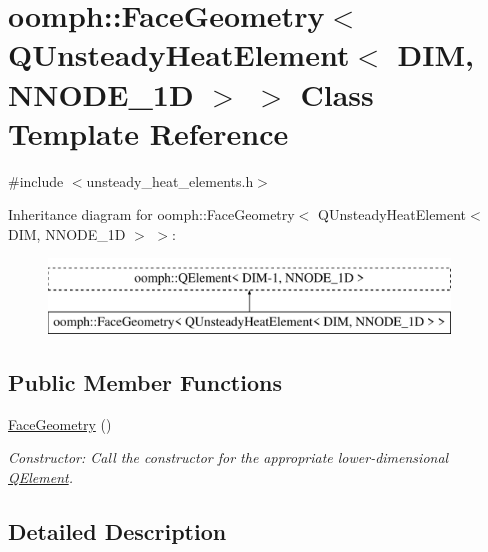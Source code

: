 \hypertarget{classoomph_1_1FaceGeometry_3_01QUnsteadyHeatElement_3_01DIM_00_01NNODE__1D_01_4_01_4}{}\section{oomph\+:\+:Face\+Geometry$<$ Q\+Unsteady\+Heat\+Element$<$ D\+IM, N\+N\+O\+D\+E\+\_\+1D $>$ $>$ Class Template Reference}
\label{classoomph_1_1FaceGeometry_3_01QUnsteadyHeatElement_3_01DIM_00_01NNODE__1D_01_4_01_4}


{\ttfamily \#include $<$unsteady\+\_\+heat\+\_\+elements.\+h$>$}

Inheritance diagram for oomph\+:\+:Face\+Geometry$<$ Q\+Unsteady\+Heat\+Element$<$ D\+IM, N\+N\+O\+D\+E\+\_\+1D $>$ $>$\+:\begin{figure}[H]
\begin{center}
\leavevmode
\includegraphics[height=2.000000cm]{classoomph_1_1FaceGeometry_3_01QUnsteadyHeatElement_3_01DIM_00_01NNODE__1D_01_4_01_4}
\end{center}
\end{figure}
\subsection*{Public Member Functions}
\begin{DoxyCompactItemize}
\item 
\hyperlink{classoomph_1_1FaceGeometry_3_01QUnsteadyHeatElement_3_01DIM_00_01NNODE__1D_01_4_01_4_a529e4a591d38ef1f613cf65159257ccc}{Face\+Geometry} ()
\begin{DoxyCompactList}\small\item\em Constructor\+: Call the constructor for the appropriate lower-\/dimensional \hyperlink{classoomph_1_1QElement}{Q\+Element}. \end{DoxyCompactList}\end{DoxyCompactItemize}


\subsection{Detailed Description}

